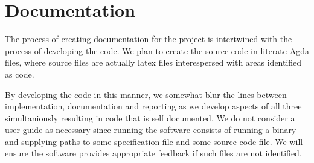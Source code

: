 \section{Documentation}

The process of creating documentation for the project is intertwined
with the process of developing the code. We plan to create the source
code in literate Agda files, where source files are actually latex
files interespersed with areas identified as code.

By developing the code in this manner, we somewhat blur the lines
between implementation, documentation and reporting as we develop
aspects of all three simultaniously resulting in code that is self
documented. We do not consider a user-guide as necessary since running
the software consists of running a binary and supplying paths to some
specification file and some source code file. We will ensure the
software provides appropriate feedback if such files are not
identified.
